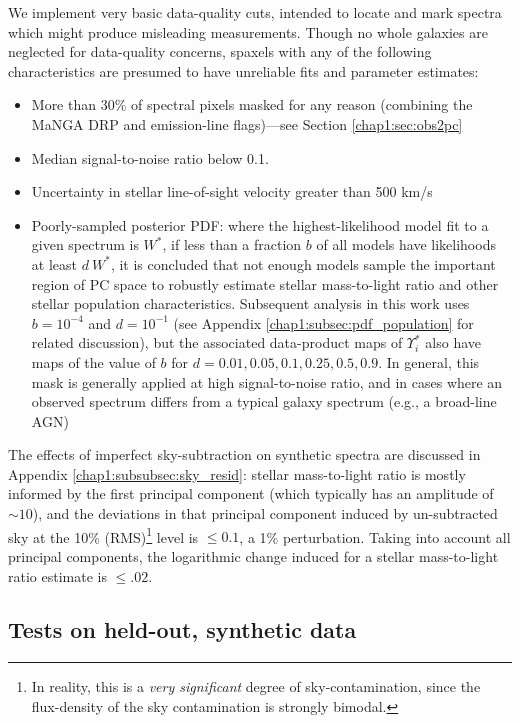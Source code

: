 We implement very basic data-quality cuts, intended to locate and mark spectra which might produce misleading measurements. Though no whole galaxies are neglected for data-quality concerns, spaxels with any of the following characteristics are presumed to have unreliable fits and parameter estimates:
\begin{itemize}
    \item More than 30\% of spectral pixels masked for any reason (combining the MaNGA DRP and emission-line flags)---see Section \ref{chap1:sec:obs2pc}
    \item Median signal-to-noise ratio below 0.1.
    \item Uncertainty in stellar line-of-sight velocity greater than 500 km/s
    \item Poorly-sampled posterior PDF: where the highest-likelihood model fit to a given spectrum is $W^*$, if less than a fraction $b$ of all models have likelihoods at least $d~W^*$, it is concluded that not enough models sample the important region of PC space to robustly estimate stellar mass-to-light ratio and other stellar population characteristics. Subsequent analysis in this work uses $b = 10^{-4}$ and $d = 10^{-1}$ (see Appendix \ref{chap1:subsec:pdf_population} for related discussion), but the associated data-product maps of $\Upsilon^*_i$ also have maps of the value of $b$ for $d = 0.01, 0.05, 0.1, 0.25, 0.5, 0.9$. In general, this mask is generally applied at high signal-to-noise ratio, and in cases where an observed spectrum differs from a typical galaxy spectrum (e.g., a broad-line AGN)
\end{itemize}

The effects of imperfect sky-subtraction on synthetic spectra are discussed in Appendix \ref{chap1:subsubsec:sky_resid}: stellar mass-to-light ratio is mostly informed by the first principal component (which typically has an amplitude of $\sim 10$), and the deviations in that principal component induced by un-subtracted sky at the 10\% (RMS)\footnote{In reality, this is a \emph{very significant} degree of sky-contamination, since the flux-density of the sky contamination is strongly bimodal.} level is $\le 0.1$, a 1\% perturbation. Taking into account all principal components, the logarithmic change induced for a stellar mass-to-light ratio estimate is $\le .02$.

\subsection{Tests on held-out, synthetic data} %
\label{chap1:subsec:mocks_tests}

